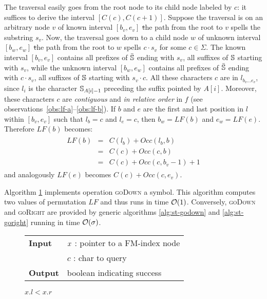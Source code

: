 The traversal easily goes from the root node to its child node labeled by $c$: it suffices to derive the interval $[C(c),C(c+1)]$.
Suppose the traversal is on an arbitrary node $v$ of known interval $[b_v, e_v]$ \st the path from the root to $v$ spells the substring $s_v$.
Now, the traversal goes down to a child node $w$ of unknown interval $[b_w, e_w]$ \st the path from the root to $w$ spells $c \cdot s_v$ for some $c \in \Sigma$.
The known interval $[b_v, e_v]$ contains all prefixes of $\bar{\mathbb {S}}$ ending with $s_v$, \ie all suffixes of $\mathbb {S}$ starting with $s_v$, while the unknown interval $[b_w, e_w]$ contains all prefixes of $\bar{\mathbb {S}}$ ending with $c \cdot s_v$, \ie all suffixes of $\mathbb {S}$ starting with $s_v \cdot c$.
All these characters $c$ are in $l_{b_v \dots e_v}$, since $l_i$ is the character $\mathbb {S}_{A[i] - 1}$ preceding the suffix pointed by $A[i]$.
Moreover, these characters $c$ are \emph{contiguous} and \emph{in relative order} in $f$ (see observations~\ref{obs:lf-a}--\ref{obs:lf-b}).
If $b$ and $e$ are the first and last position in $l$ within $[b_v, e_v]$ such that $l_b = c$ and $l_e = c$, then $b_w = LF(b)$ and $e_w = LF(e)$.
Therefore $LF(b)$ becomes:
\begin{eqnarray}
\begin{array}{lcl}
LF(b) &=& C(l_b) + Occ(l_b, b)\\
 	  &=& C(c) + Occ(c, b)\\
	  &=& C(c) + Occ(c, b_v - 1) + 1
\end{array}
\end{eqnarray}
and analogously $LF(e)$ becomes $C(c) + Occ(c, e_v)$.

Algorithm \ref{alg:fm-godownc} implements operation \textsc{goDown} a symbol.
This algorithm computes two values of permutation $LF$ and thus runs in time $\mathcal{O}(1)$.
Conversely, \textsc{goDown} and \textsc{goRight} are provided by generic algorithms \ref{alg:st-godown} and \ref{alg:st-goright} running in time $\mathcal{O}(\sigma)$.


\begin{figure*}
\begin{center}
\begin{minipage}[t]{.5\textwidth}
\begin{algorithm}[H]
\begin{tabular}{ll}
\textbf{Input}  & $x$ : pointer to a FM-index node\\
				& $c$ : char to query\\
\textbf{Output} & boolean indicating success\\
\end{tabular}
\begin{algorithmic}[1]
	\State \Return \False
\EndIf
{}
\State \Return $x.l < x.r$
\end{algorithmic}
\label{alg:fm-godownc}
\end{algorithm}
\end{minipage}
\end{center}
\end{figure*}

